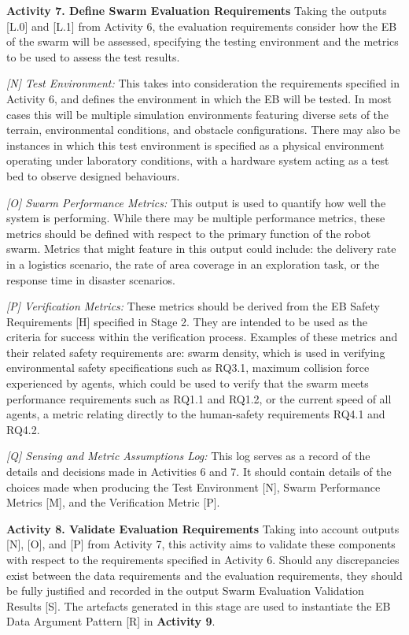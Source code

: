 \documentclass[runningheads]{llncs}
\begin{document}
\noindent\textbf{Activity 7. Define Swarm Evaluation Requirements} Taking the outputs [L.0] and [L.1] from Activity 6, the evaluation requirements consider how the EB of the swarm will be assessed, specifying the testing environment and the metrics to be used to assess the test results.

\emph{[N] Test Environment:} This takes into consideration the requirements specified in Activity 6, and defines the environment in which the EB will be tested. In most cases this will be multiple simulation environments featuring diverse sets of the terrain, environmental conditions, and obstacle configurations. There may also be instances in which this test environment is specified as a physical environment operating under laboratory conditions, with a hardware system acting as a test bed to observe designed behaviours.

\emph{[O] Swarm Performance Metrics:} This output is used to quantify how well the system is performing. While there may be multiple performance metrics, these metrics should be defined with respect to the primary function of the robot swarm. Metrics that might feature in this output could include: the delivery rate in a logistics scenario, the rate of area coverage in an exploration task, or the response time in disaster scenarios.

\emph{[P] Verification Metrics:} These metrics should be derived from the EB Safety Requirements [H] specified in Stage 2. They are intended to be used as the criteria for success within the verification process. Examples of these metrics and their related safety requirements are: swarm density, which is used in verifying environmental safety specifications such as RQ3.1, maximum collision force experienced by agents, which could be used to verify that the swarm meets performance requirements such as RQ1.1 and RQ1.2, or the current speed of all agents, a metric relating directly to the human-safety requirements RQ4.1 and RQ4.2. %

\emph{[Q] Sensing and Metric Assumptions Log:} This log serves as a record of the details and decisions made in Activities 6 and 7. It should contain details of the choices made when producing the Test Environment [N], Swarm Performance Metrics [M], and the Verification Metric [P].

\noindent\textbf{Activity 8. Validate Evaluation Requirements} Taking into account outputs [N], [O], and [P] from Activity 7, this activity aims to validate these components with respect to the requirements specified in Activity 6. Should any discrepancies exist between the data requirements and the evaluation requirements, they should be fully justified and recorded in the output Swarm Evaluation Validation Results [S]. 
The artefacts generated in this stage are used to instantiate the EB Data Argument Pattern [R] in \textbf{Activity 9}.
\end{document}
